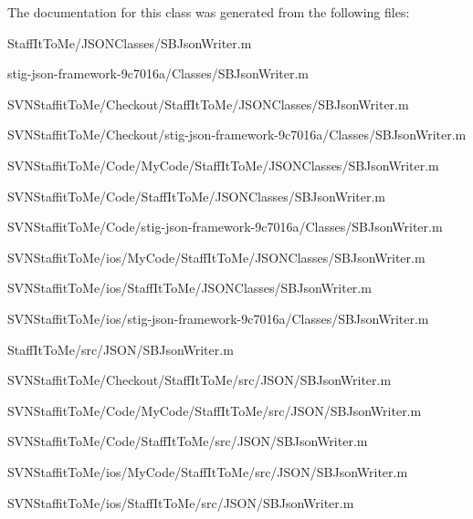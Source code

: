 \-The documentation for this class was generated from the following files\-:\begin{DoxyCompactItemize}
\item 
\-Staff\-It\-To\-Me/\-J\-S\-O\-N\-Classes/\-S\-B\-Json\-Writer.\-m\item 
stig-\/json-\/framework-\/9c7016a/\-Classes/\-S\-B\-Json\-Writer.\-m\item 
\-S\-V\-N\-Staffit\-To\-Me/\-Checkout/\-Staff\-It\-To\-Me/\-J\-S\-O\-N\-Classes/\-S\-B\-Json\-Writer.\-m\item 
\-S\-V\-N\-Staffit\-To\-Me/\-Checkout/stig-\/json-\/framework-\/9c7016a/\-Classes/\-S\-B\-Json\-Writer.\-m\item 
\-S\-V\-N\-Staffit\-To\-Me/\-Code/\-My\-Code/\-Staff\-It\-To\-Me/\-J\-S\-O\-N\-Classes/\-S\-B\-Json\-Writer.\-m\item 
\-S\-V\-N\-Staffit\-To\-Me/\-Code/\-Staff\-It\-To\-Me/\-J\-S\-O\-N\-Classes/\-S\-B\-Json\-Writer.\-m\item 
\-S\-V\-N\-Staffit\-To\-Me/\-Code/stig-\/json-\/framework-\/9c7016a/\-Classes/\-S\-B\-Json\-Writer.\-m\item 
\-S\-V\-N\-Staffit\-To\-Me/ios/\-My\-Code/\-Staff\-It\-To\-Me/\-J\-S\-O\-N\-Classes/\-S\-B\-Json\-Writer.\-m\item 
\-S\-V\-N\-Staffit\-To\-Me/ios/\-Staff\-It\-To\-Me/\-J\-S\-O\-N\-Classes/\-S\-B\-Json\-Writer.\-m\item 
\-S\-V\-N\-Staffit\-To\-Me/ios/stig-\/json-\/framework-\/9c7016a/\-Classes/\-S\-B\-Json\-Writer.\-m\item 
\-Staff\-It\-To\-Me/src/\-J\-S\-O\-N/\-S\-B\-Json\-Writer.\-m\item 
\-S\-V\-N\-Staffit\-To\-Me/\-Checkout/\-Staff\-It\-To\-Me/src/\-J\-S\-O\-N/\-S\-B\-Json\-Writer.\-m\item 
\-S\-V\-N\-Staffit\-To\-Me/\-Code/\-My\-Code/\-Staff\-It\-To\-Me/src/\-J\-S\-O\-N/\-S\-B\-Json\-Writer.\-m\item 
\-S\-V\-N\-Staffit\-To\-Me/\-Code/\-Staff\-It\-To\-Me/src/\-J\-S\-O\-N/\-S\-B\-Json\-Writer.\-m\item 
\-S\-V\-N\-Staffit\-To\-Me/ios/\-My\-Code/\-Staff\-It\-To\-Me/src/\-J\-S\-O\-N/\-S\-B\-Json\-Writer.\-m\item 
\-S\-V\-N\-Staffit\-To\-Me/ios/\-Staff\-It\-To\-Me/src/\-J\-S\-O\-N/\-S\-B\-Json\-Writer.\-m\end{DoxyCompactItemize}

